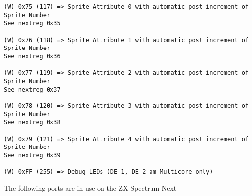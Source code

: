 \begin{verbatim}
(W) 0x75 (117) => Sprite Attribute 0 with automatic post increment of Sprite Number
See nextreg 0x35

(W) 0x76 (118) => Sprite Attribute 1 with automatic post increment of Sprite Number
See nextreg 0x36

(W) 0x77 (119) => Sprite Attribute 2 with automatic post increment of Sprite Number
See nextreg 0x37

(W) 0x78 (120) => Sprite Attribute 3 with automatic post increment of Sprite Number
See nextreg 0x38

(W) 0x79 (121) => Sprite Attribute 4 with automatic post increment of Sprite Number
See nextreg 0x39

(W) 0xFF (255) => Debug LEDs (DE-1, DE-2 am Multicore only)
\end{verbatim}
The following ports are in use on the ZX Spectrum Next

